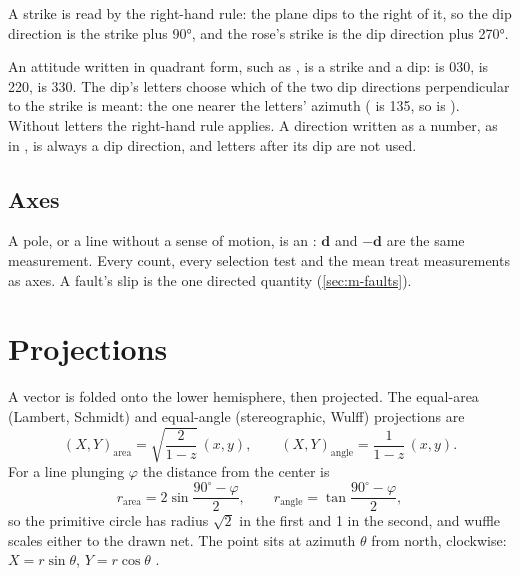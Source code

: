 A strike is read by the right-hand rule: the plane dips to the right of it, so the dip direction is
the strike plus 90°, and the rose's strike is the dip direction plus 270°.

An attitude written in quadrant form, such as , is a strike and a dip:
 is 030,  is 220,  is 330. The dip's letters choose which of the two
dip directions perpendicular to the strike is meant: the one nearer the letters' azimuth ( is
135, so  is ). Without letters the right-hand rule applies. A direction
written as a number, as in , is always a dip direction, and letters after its dip are not
used.

\subsection{Axes}

A pole, or a line without a sense of motion, is an : $\mathbf{d}$ and $-\mathbf{d}$ are the
same measurement. Every count, every selection test and the mean treat measurements as axes. A fault's
slip is the one directed quantity (\cref{sec:m-faults}).

\section{Projections}\label{sec:m-projection}

A vector is folded onto the lower hemisphere, then projected. The equal-area (Lambert, Schmidt) and
equal-angle (stereographic, Wulff) projections are
\[ (X, Y)_{\mathrm{area}} = \sqrt{\frac{2}{1 - z}}\,(x, y), \qquad (X, Y)_{\mathrm{angle}} = \frac{1}{1 - z}\,(x, y). \]
For a line plunging $\varphi$ the distance from the center is
\[ r_{\mathrm{area}} = 2 \sin\frac{90^\circ - \varphi}{2}, \qquad r_{\mathrm{angle}} = \tan\frac{90^\circ - \varphi}{2}, \]
so the primitive circle has radius $\sqrt{2}$ in the first and 1 in the second, and wuffle scales either
to the drawn net. The point sits at azimuth $\theta$ from north, clockwise: $X = r\sin\theta$,
$Y = r\cos\theta$ \parencite{snyder1987}.

\begin{center}
\end{center}

